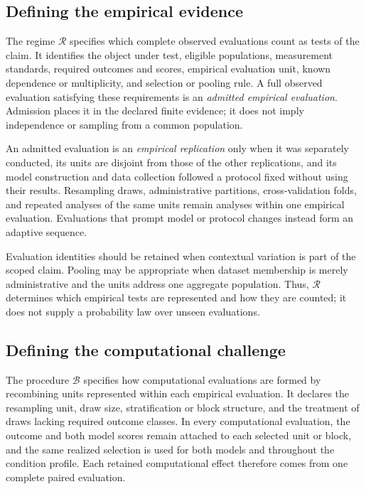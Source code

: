 \documentclass[11pt]{article}
\newcommand{\Regime}{\mathcal{R}}
\newcommand{\Boot}{\mathcal{B}}
\theoremstyle{remark}
\begin{document}
\subsection{Defining the empirical evidence}

The regime $\Regime$ specifies which complete observed evaluations count as
tests of the claim. It identifies the object under test, eligible populations,
measurement standards, required outcomes and scores, empirical evaluation
unit, known dependence or multiplicity, and selection or pooling rule. A full
observed evaluation satisfying these requirements is an \emph{admitted
empirical evaluation}. Admission places it in the declared finite evidence; it
does not imply independence or sampling from a common population.

An admitted evaluation is an \emph{empirical replication} only when it was
separately conducted, its units are disjoint from those of the other
replications, and its model construction and data collection followed a
protocol fixed without using their results. Resampling draws, administrative
partitions, cross-validation folds, and repeated analyses of the same units
remain analyses within one empirical evaluation. Evaluations that prompt model
or protocol changes instead form an adaptive sequence.

Evaluation identities should be retained when contextual variation is part of
the scoped claim. Pooling may be appropriate when dataset membership is merely
administrative and the units address one aggregate population. Thus,
$\Regime$ determines which empirical tests are represented and how they are
counted; it does not supply a probability law over unseen evaluations.

\subsection{Defining the computational challenge}

The procedure $\Boot$ specifies how computational evaluations are formed by
recombining units represented within each empirical evaluation. It declares
the resampling unit, draw size, stratification or block structure, and the
treatment of draws lacking required outcome classes. In every computational
evaluation, the outcome and both model scores remain attached to each selected
unit or block, and the same realized selection is used for both models and
throughout the condition profile. Each retained computational effect therefore
comes from one complete paired evaluation.
\end{document}
